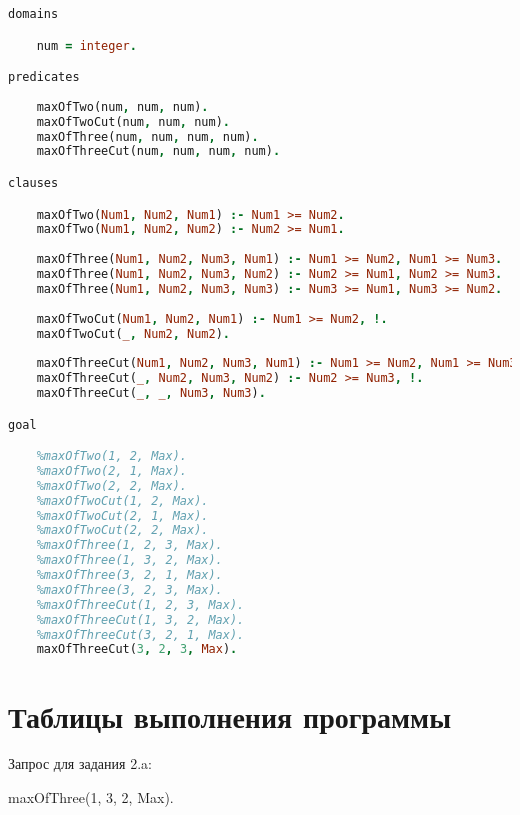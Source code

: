 \documentclass[14pt,a4paper]{scrreprt}
\begin{document}
\begin{lstlisting}[language=Prolog]
domains

	num = integer.

predicates
	
	maxOfTwo(num, num, num).
	maxOfTwoCut(num, num, num).
	maxOfThree(num, num, num, num).
	maxOfThreeCut(num, num, num, num).

clauses

	maxOfTwo(Num1, Num2, Num1) :- Num1 >= Num2.
	maxOfTwo(Num1, Num2, Num2) :- Num2 >= Num1.
	
	maxOfThree(Num1, Num2, Num3, Num1) :- Num1 >= Num2, Num1 >= Num3.
	maxOfThree(Num1, Num2, Num3, Num2) :- Num2 >= Num1, Num2 >= Num3.
	maxOfThree(Num1, Num2, Num3, Num3) :- Num3 >= Num1, Num3 >= Num2.
	
	maxOfTwoCut(Num1, Num2, Num1) :- Num1 >= Num2, !.
	maxOfTwoCut(_, Num2, Num2).
	
	maxOfThreeCut(Num1, Num2, Num3, Num1) :- Num1 >= Num2, Num1 >= Num3, !.
	maxOfThreeCut(_, Num2, Num3, Num2) :- Num2 >= Num3, !.
	maxOfThreeCut(_, _, Num3, Num3).

goal

	%maxOfTwo(1, 2, Max).
	%maxOfTwo(2, 1, Max).
	%maxOfTwo(2, 2, Max).
	%maxOfTwoCut(1, 2, Max).
	%maxOfTwoCut(2, 1, Max).
	%maxOfTwoCut(2, 2, Max).
	%maxOfThree(1, 2, 3, Max).
	%maxOfThree(1, 3, 2, Max).
	%maxOfThree(3, 2, 1, Max).
	%maxOfThree(3, 2, 3, Max).
	%maxOfThreeCut(1, 2, 3, Max).
	%maxOfThreeCut(1, 3, 2, Max).
	%maxOfThreeCut(3, 2, 1, Max).
	maxOfThreeCut(3, 2, 3, Max).
\end{lstlisting}

\newpage
\section{Таблицы выполнения программы}

Запрос для задания 2.a:

maxOfThree(1, 3, 2, Max).
\end{document}
